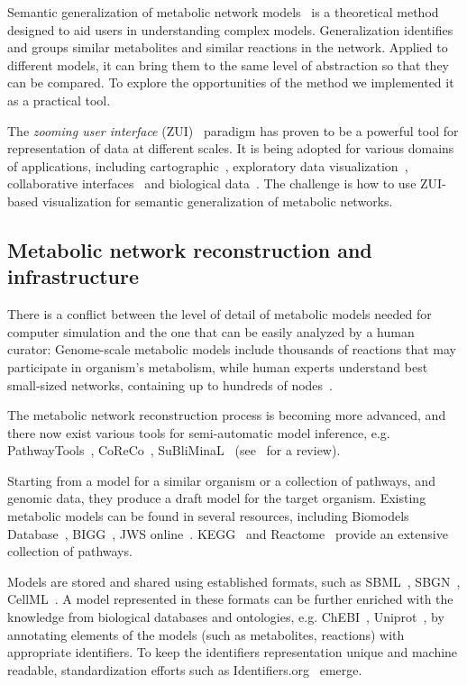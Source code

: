 \documentclass{bmcart}
\begin{document}
Semantic generalization of metabolic network models~\cite{Zhukova2014} is a theoretical method designed to aid users in understanding complex models. Generalization identifies and groups similar metabolites and similar reactions in the network.
Applied to different models, it can bring them to the same level of abstraction so that they can be compared.
To explore the opportunities of the method we implemented it as a practical tool.

The \emph{zooming user interface} (ZUI)~\cite{Bederson1998} paradigm has proven to be a powerful tool for representation of data at different scales. It is being adopted for various domains of applications, including cartographic~\cite{Nivala2008}, exploratory data visualization~\cite{Roberts2005}, collaborative interfaces~\cite{Laufer2011} and biological data~\cite{Pook1998, Hu2007}. The challenge is how to use ZUI-based visualization for semantic generalization of metabolic networks.

\subsection*{Metabolic network reconstruction and infrastructure}
There is a conflict between the level of detail of metabolic models needed for computer simulation and the one that can be easily analyzed by a human curator: Genome-scale metabolic models include thousands of reactions that may participate in organism's metabolism, while human experts understand best small-sized networks, containing up to hundreds of nodes~\cite{VonLandesberger2011,Herman2000}.

The metabolic network reconstruction process is becoming more advanced, and there now exist various tools for semi-automatic model inference, e.g. PathwayTools~\cite{Karp2002}, CoReCo~\cite{Pitkanen2014}, SuBliMinaL~\cite{Swainston2011} (see~\cite{Hamilton2014} for a review).

Starting from a model for a similar organism or a collection of pathways, and genomic data, they produce a draft model for the target organism. Existing metabolic models can be found in several resources, including Biomodels Database~\cite{Li10}, BIGG~\cite{Schellenberger2010}, JWS online~\cite{Snoep2003}. KEGG~\cite{Kanehisa12} and Reactome~\cite{Milacic2012, Croft2013} provide an extensive collection of pathways. 

Models are stored and shared using established formats, such as SBML~\cite{Hucka2003}, SBGN~\cite{LeNovere2009}, CellML~\cite{Lloyd2004}. A model represented in these formats can be further enriched with the knowledge from biological databases and ontologies, e.g. ChEBI~\cite{deMatos10}, Uniprot~\cite{TheUniProtConsortium2014}, by annotating elements of the models (such as metabolites, reactions) with appropriate identifiers. To keep the identifiers representation unique and machine readable, standardization efforts such as Identifiers.org~\cite{Juty2012} emerge.
\end{document}
